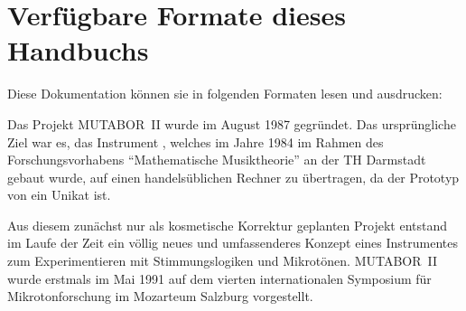 
\subject{Programmier- und Bedienungshandbuch}


%
\ifhtml
\setcounter{tocdepth}{1}
\fi

\maketitle
\ifhtml\ifhelp\else
\section*{Verfügbare Formate dieses Handbuchs}
Diese Dokumentation können sie in folgenden Formaten lesen und ausdrucken:

\fi
\else
\tableofcontents
\fi

Das Projekt MUTABOR~II wurde im August 1987
gegründet. Das ursprüngliche Ziel war es, das Instrument \mutabor{},
welches im Jahre 1984 im Rahmen des Forschungsvorhabens
"`Mathematische Musiktheorie"' an der TH Darmstadt gebaut wurde, auf
einen handels\-üblichen Rechner zu übertragen, da der Prototyp von
\mutabor{} ein Unikat ist.

Aus diesem zunächst nur als kosmetische Korrektur geplanten Projekt
entstand im Laufe der Zeit ein völlig neues und umfassenderes Konzept
eines Instrumentes zum Experimentieren mit Stimmungslogiken und
Mikrotönen. MUTABOR~II wurde erstmals im Mai 1991 auf dem vierten
internationalen Symposium für Mikrotonforschung im Mozarteum Salzburg
vorgestellt.

